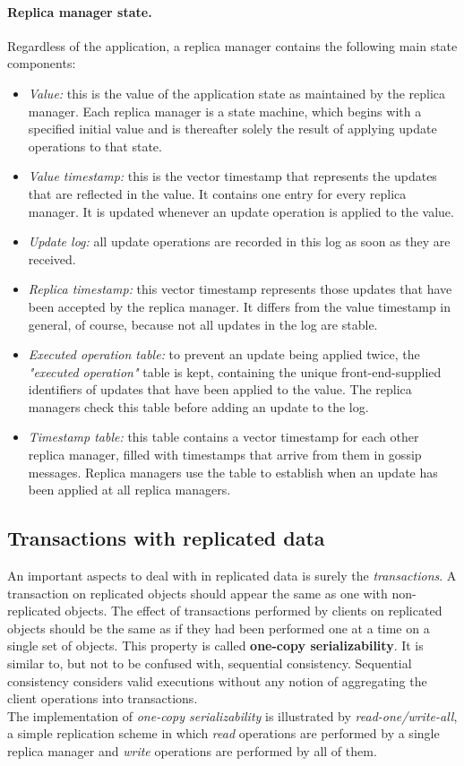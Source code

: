 \paragraph*{Replica manager state.} Regardless of the application, a replica manager contains the following main state components:
\begin{itemize}
	\item \textit{Value:} this is the value of the application state as maintained by the replica manager. Each replica manager is a state machine, which begins with a specified initial value and is thereafter solely the result of applying update operations to that state.
	\item \textit{Value timestamp:} this is the vector timestamp that represents the updates that are reflected in the value. It contains one entry for every replica manager. It is updated whenever an update operation is applied to the value.
	\item \textit{Update log:} all update operations are recorded in this log as soon as they are received.
	\item \textit{Replica timestamp:} this vector timestamp represents those updates that have been accepted by the replica manager. It differs from the value timestamp in general, of course, because not all updates in the log are stable.
	\item \textit{Executed operation table:} to prevent an update being applied twice, the \textit{"executed operation"} table is kept, containing the unique front-end-supplied identifiers of updates that have been applied to the value. The replica managers check this table before adding an update to the log.
	\item \textit{Timestamp table:} this table contains a vector timestamp for each other replica manager, filled with timestamps that arrive from them in gossip messages. Replica managers use the table to establish when an update has been applied at all replica managers.
\end{itemize}

\subsection{Transactions with replicated data}
An important aspects to deal with in replicated data is surely the \textit{transactions}. A transaction on replicated objects should appear the same as one with non-replicated objects. The effect of transactions performed by clients on replicated objects should be the same as if they had been performed one at a time on a single set of objects. This property is called \textbf{one-copy serializability}. It is similar to, but not to be confused with, sequential consistency. Sequential consistency considers valid executions without any notion of aggregating the client operations into transactions.\\
The implementation of \textit{one-copy serializability} is illustrated by \textit{read-one/write-all}, a simple replication scheme in which \textit{read} operations are performed by a single replica manager and \textit{write} operations are performed by all of them.

